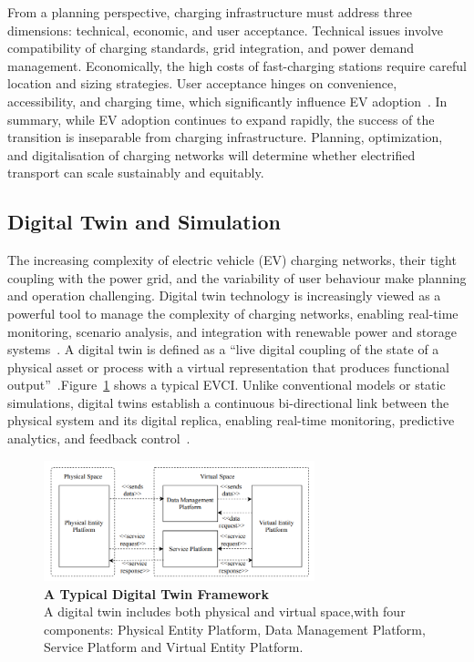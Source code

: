 From a planning perspective, charging infrastructure must address three 
dimensions: technical, economic, and user acceptance. Technical 
issues involve compatibility of charging standards, grid integration, and power 
demand management. Economically, the high costs of fast-charging stations 
require careful location and sizing strategies. User acceptance hinges on 
convenience, accessibility, and charging time, which significantly influence EV 
adoption~\cite{LaMonaca2022}. In summary, while EV adoption continues to expand rapidly, the success of the 
transition is inseparable from charging infrastructure. Planning, optimization, and 
digitalisation of charging networks will determine whether electrified transport 
can scale sustainably and equitably.

\subsection{Digital Twin and Simulation}

The increasing complexity of electric vehicle (EV) charging networks, 
their tight coupling with the power grid, and the variability of user 
behaviour make planning and operation challenging. Digital twin 
technology is increasingly viewed as a powerful tool to manage the complexity 
of charging networks, enabling real-time monitoring, scenario analysis, and 
integration with renewable power and storage systems~\cite{Yu2024}. A digital twin is defined as a ``live digital coupling of the state 
of a physical asset or process with a virtual representation that 
produces functional output''~\cite{Somers2023}.Figure~\ref{fig:DT_diagram} shows a typical EVCI. Unlike conventional 
models or static simulations, digital twins establish a continuous 
bi-directional link between the physical system and its digital replica, 
enabling real-time monitoring, predictive analytics, and feedback 
control~\cite{Liu2021Review,Enders2019}.

\begin{figure}[ht!]
    \centering
    \includegraphics[width=0.7\textwidth]{Images/DT_diagram.png}
    \caption{\textbf{A Typical Digital Twin Framework}~\cite{8823809} \\
     A digital twin includes both physical and virtual space,with four components: Physical Entity Platform, Data Management Platform, Service Platform and Virtual Entity Platform.
}
    \label{fig:DT_diagram}
\end{figure}

